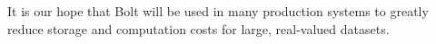 \documentclass[sigconf]{acmart}  %
\begin{document}
It is our hope that Bolt will be used in many production systems to greatly reduce storage and computation costs for large, real-valued datasets.









% 

\end{document}
